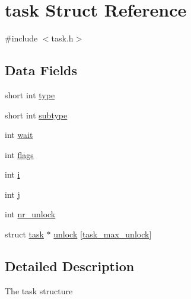 \hypertarget{structtask}{\section{task Struct Reference}
\label{structtask}
}


{\ttfamily \#include $<$task.\-h$>$}

\subsection*{Data Fields}
\begin{DoxyCompactItemize}
\item 
short int \hyperlink{structtask_aaa8ba4297d83f2cce5af75b18564ae13}{type}
\item 
short int \hyperlink{structtask_af211cd3d9a83521309369c8e3f3ed87d}{subtype}
\item 
int \hyperlink{structtask_aaefdb10b18059f3c08332338630b3f68}{wait}
\item 
int \hyperlink{structtask_ac8bf36fe0577cba66bccda3a6f7e80a4}{flags}
\item 
int \hyperlink{structtask_acb559820d9ca11295b4500f179ef6392}{i}
\item 
int \hyperlink{structtask_a37d972ae0b47b9099e30983131d31916}{j}
\item 
int \hyperlink{structtask_a060ca3576648f40a2488d5b81ff5bb8e}{nr\-\_\-unlock}
\item 
struct \hyperlink{structtask}{task} $\ast$ \hyperlink{structtask_a9ea2a7c7ec9d2b1b1bc4ef7a89c6727b}{unlock} \mbox{[}\hyperlink{task_8h_a222ad2234468d880c3d5482374d28bc3}{task\-\_\-max\-\_\-unlock}\mbox{]}
\end{DoxyCompactItemize}


\subsection{Detailed Description}
The task structure 

